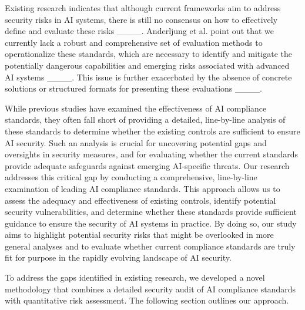 Existing research indicates that although current frameworks aim to address security risks in AI systems, there is still no consensus on how to effectively define and evaluate these risks ____. Anderljung et al. point out that we currently lack a robust and comprehensive set of evaluation methods to operationalize these standards, which are necessary to identify and mitigate the potentially dangerous capabilities and emerging risks associated with advanced AI systems ____. This issue is further exacerbated by the absence of concrete solutions or structured formats for presenting these evaluations ____.

While previous studies have examined the effectiveness of AI compliance standards, they often fall short of providing a detailed, line-by-line analysis of these standards to determine whether the existing controls are sufficient to ensure AI security. Such an analysis is crucial for uncovering potential gaps and oversights in security measures, and for evaluating whether the current standards provide adequate safeguards against emerging AI-specific threats. Our research addresses this critical gap by conducting a comprehensive, line-by-line examination of leading AI compliance standards. This approach allows us to assess the adequacy and effectiveness of existing controls, identify potential security vulnerabilities, and determine whether these standards provide sufficient guidance to ensure the security of AI systems in practice. By doing so, our study aims to highlight potential security risks that might be overlooked in more general analyses and to evaluate whether current compliance standards are truly fit for purpose in the rapidly evolving landscape of AI security.

To address the gaps identified in existing research, we developed a novel methodology that combines a detailed security audit of AI compliance standards with quantitative risk assessment. The following section outlines our approach.